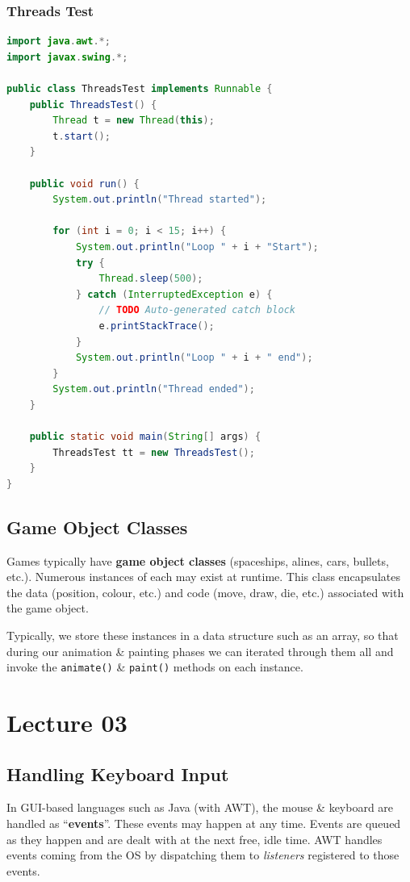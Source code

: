 \documentclass[11pt]{article}
\begin{document}
\subsubsection{Threads Test}
\begin{lstlisting}[language=Java]
import java.awt.*;
import javax.swing.*; 

public class ThreadsTest implements Runnable {
    public ThreadsTest() {
        Thread t = new Thread(this); 
        t.start(); 
    }

    public void run() {
        System.out.println("Thread started");

        for (int i = 0; i < 15; i++) {
            System.out.println("Loop " + i + "Start"); 
            try {
                Thread.sleep(500);
            } catch (InterruptedException e) {
                // TODO Auto-generated catch block 
                e.printStackTrace(); 
            } 
            System.out.println("Loop " + i + " end"); 
        }
        System.out.println("Thread ended"); 
    }

    public static void main(String[] args) {
        ThreadsTest tt = new ThreadsTest(); 
    }
}
\end{lstlisting}

\subsection{Game Object Classes}
Games typically have \textbf{game object classes} (spaceships, alines, cars, bullets, etc.). 
Numerous instances of each may exist at runtime. 
This class encapsulates the data (position, colour, etc.) and code (move, draw, die, etc.) associated with the game object.

Typically, we store these instances in a data structure such as an array, so that during our animation \& painting phases we can iterated through them all and invoke the \verb|animate()| \& \verb|paint()| methods on each instance. 

\section{Lecture 03}
\subsection{Handling Keyboard Input}
In GUI-based languages such as Java (with AWT), the mouse \& keyboard are handled as ``\textbf{events}''. 
These events may happen at any time. 
Events are queued as they happen and are dealt with at the next free, idle time. 
AWT handles events coming from the OS by dispatching them to \textit{listeners} registered to those events. 
\end{document}
